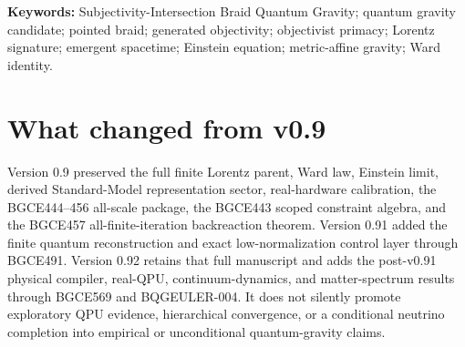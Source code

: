 \documentclass[11pt]{article}
\theoremstyle{definition}
\theoremstyle{remark}
\begin{document}
\begin{abstract}
The result remains scoped. The finite parent uses the aligned four-score and block-local collision class rather than full ten-component nonlinear metric dynamics. Identity feedback and the metric-conductance map are not proved unique among all admissible dynamics. The direct Fisher coefficient $1$ and routing ratio $3/5$ are now reconciled as differently typed exact quantities, not equated. The physical ADM projector, smooth Fierz--Pauli principal-symbol identity, nonlinear Euler convergence, provider-clock traceability, observed particle labels, RG running, total uncertainty, and an empirical gravity discriminator remain open. The results refute the universal necessity thesis of \emph{objectivist primacy} by construction; they do not refute mind-independent reality, establish phenomenal consciousness, or show that nature realizes the model.
\end{abstract}

\noindent\textbf{Keywords:} Subjectivity-Intersection Braid Quantum Gravity; quantum gravity candidate; pointed braid; generated objectivity; objectivist primacy; Lorentz signature; emergent spacetime; Einstein equation; metric-affine gravity; Ward identity.

\section{What changed from v0.9}

Version 0.9 preserved the full finite Lorentz parent, Ward law, Einstein limit, derived Standard-Model representation sector, real-hardware calibration, the BGCE444--456 all-scale package, the BGCE443 scoped constraint algebra, and the BGCE457 all-finite-iteration backreaction theorem. Version 0.91 added the finite quantum reconstruction and exact low-normalization control layer through BGCE491. Version 0.92 retains that full manuscript and adds the post-v0.91 physical compiler, real-QPU, continuum-dynamics, and matter-spectrum results through BGCE569 and BQGEULER-004. It does not silently promote exploratory QPU evidence, hierarchical convergence, or a conditional neutrino completion into empirical or unconditional quantum-gravity claims.
\end{document}
